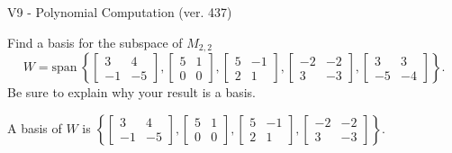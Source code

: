 \begin{exercise}
  \begin{exerciseTitle}V9 - Polynomial Computation (ver. 437)\end{exerciseTitle}
  \begin{exerciseStatement}
    Find a basis for the subspace of \(M_{2,2}\) 
\[W=\mathrm{span}\ \left\{\left[\begin{array}{cc}
3 & 4 \\
-1 & -5
\end{array}\right] , \left[\begin{array}{cc}
5 & 1 \\
0 & 0
\end{array}\right] , \left[\begin{array}{cc}
5 & -1 \\
2 & 1
\end{array}\right] , \left[\begin{array}{cc}
-2 & -2 \\
3 & -3
\end{array}\right] , \left[\begin{array}{cc}
3 & 3 \\
-5 & -4
\end{array}\right]\right\}.\]
 Be sure to explain why your result is a basis.


  \end{exerciseStatement}
  \begin{exerciseAnswer}
   A basis of \(W\) is  \(\left\{\left[\begin{array}{cc}
3 & 4 \\
-1 & -5
\end{array}\right] , \left[\begin{array}{cc}
5 & 1 \\
0 & 0
\end{array}\right] , \left[\begin{array}{cc}
5 & -1 \\
2 & 1
\end{array}\right] , \left[\begin{array}{cc}
-2 & -2 \\
3 & -3
\end{array}\right]\right\}\).
  


  \end{exerciseAnswer}
\end{exercise}